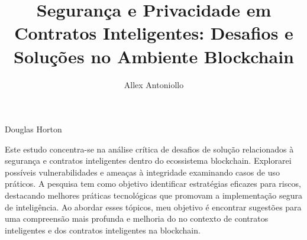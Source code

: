 \documentclass[portuguese,oneside]{UFFStex}
\author{Allex Antoniollo}
\title{Segurança e Privacidade em Contratos Inteligentes: Desafios e Soluções no Ambiente Blockchain}
      {Security and Privacy in Smart Contracts: Challenges and Solutions in the Blockchain Environment}
\begin{document}



         {Douglas Horton}



\begin{resumo}
Este estudo concentra-se na análise crítica  de desafios de solução relacionados à segurança  e contratos inteligentes dentro do ecossistema blockchain.  
 Explorarei possíveis vulnerabilidades e ameaças à integridade  examinando casos de uso práticos.  
 A pesquisa tem como objetivo identificar  estratégias eficazes para riscos, destacando  melhores práticas tecnológicas que promovam a  implementação segura de inteligência.  
 Ao abordar esses tópicos, meu objetivo  é encontrar sugestões para uma compreensão mais profunda  e melhoria do no contexto de contratos inteligentes e  dos contratos inteligentes na blockchain.  
\end{resumo}
\end{document}
